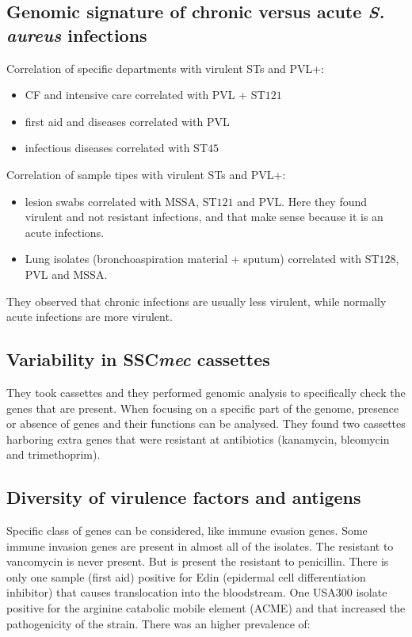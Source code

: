     \subsection{Genomic signature of chronic versus acute \emph{S. aureus} infections}
    Correlation of specific departments with virulent STs and PVL+:

    \begin{multicols}{2}
        \begin{itemize}
            \item CF and intensive care correlated with PVL + ST$121$
            \item first aid and diseases correlated with PVL
            \item infectious diseases correlated with ST$45$
        \end{itemize}
    \end{multicols}

    Correlation of sample tipes with virulent STs and PVL+:

    \begin{multicols}{2}
        \begin{itemize}
            \item lesion swabs correlated with MSSA, ST$121$ and PVL.
                Here they found virulent and not resistant infections, and that make sense because it is an acute infections.
            \item Lung isolates (bronchoaspiration material + sputum) correlated with ST$128$, PVL and MSSA.
        \end{itemize}
    \end{multicols}

    They observed that chronic infections are usually less virulent, while normally acute infections are more virulent.

    \subsection{Variability in SSC\emph{mec} cassettes}
    They took cassettes and they performed genomic analysis to specifically check the genes that are present.
    When focusing on a specific part of the genome, presence or absence of genes and their functions can be analysed.
    They found two cassettes harboring extra genes that were resistant at antibiotics (kanamycin, bleomycin and trimethoprim).

    \subsection{Diversity of virulence factors and antigens}
    Specific class of genes can be considered, like immune evasion genes.
    Some immune invasion genes are present in almost all of the isolates.
    The resistant to vancomycin is never present.
    But is present the resistant to penicillin.
    There is only one sample (first aid) positive for Edin (epidermal cell differentiation inhibitor) that causes translocation into the bloodstream.
    One USA300 isolate positive for the arginine catabolic mobile element (ACME) and that increased the pathogenicity of the strain.
    There was an higher prevalence of:

